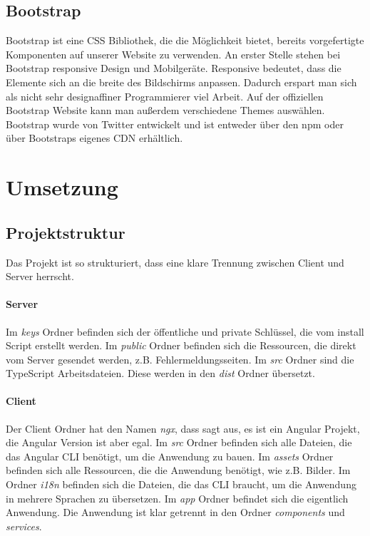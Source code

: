 \subsection{Bootstrap}
\label{sec:vor-bootstrap}
Bootstrap ist eine CSS Bibliothek, die die Möglichkeit bietet, bereits vorgefertigte Komponenten auf unserer Website zu verwenden. An erster Stelle stehen bei Bootstrap responsive Design und Mobilgeräte. Responsive bedeutet, dass die Elemente sich an die breite des Bildschirms anpassen. Dadurch erspart man sich als nicht sehr designaffiner Programmierer viel Arbeit. Auf der offiziellen Bootstrap Website kann man außerdem verschiedene Themes auswählen. Bootstrap wurde von Twitter entwickelt und ist entweder über den \ac{npm} oder über Bootstraps eigenes \ac{CDN} erhältlich.

\section{Umsetzung}
\label{sec:umsetzung}

\subsection{Projektstruktur}
\label{sec:ums-projektstruktur}

Das Projekt ist so strukturiert, dass eine klare Trennung zwischen Client und Server herrscht.
\paragraph*{Server} Im \textit{keys} Ordner befinden sich der öffentliche und private Schlüssel, die vom install Script erstellt werden. Im \textit{public} Ordner befinden sich die Ressourcen, die direkt vom Server gesendet werden, z.B. Fehlermeldungsseiten. Im \textit{src} Ordner sind die TypeScript Arbeitsdateien. Diese werden in den \textit{dist} Ordner übersetzt.
\paragraph*{Client} Der Client Ordner hat den Namen \textit{ngx}, dass sagt aus, es ist ein Angular Projekt, die Angular Version ist aber egal. Im \textit{src} Ordner befinden sich alle Dateien, die das Angular \ac{CLI} benötigt, um die Anwendung zu bauen. Im \textit{assets} Ordner befinden sich alle Ressourcen, die die Anwendung benötigt, wie z.B. Bilder. Im Ordner \textit{i18n} befinden sich die Dateien, die das \ac{CLI} braucht, um die Anwendung in mehrere Sprachen zu übersetzen. Im \textit{app} Ordner befindet sich die eigentlich Anwendung. Die Anwendung ist klar getrennt in den Ordner \textit{components} und \textit{services}.

